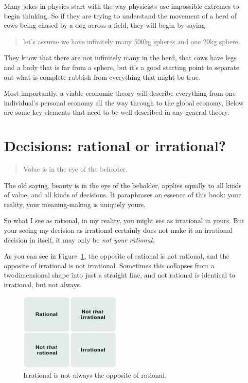 Many jokes in physics start with the way physicists  use impossible extremes to begin thinking. So if they are trying to understand the movement of a herd of cows being chased by a dog across a field, they will begin by saying: 
\begin{quote}
let's assume we have infinitely many 500kg spheres and one 20kg sphere.
\end{quote} 
They know that there are not infinitely many in the herd, that cows have legs and a body that is far from a sphere, but it's a good starting point to separate out what is complete rubbish from everything that might be true. 


Most importantly, a viable economic theory   will describe everything from one individual's personal economy all the way through to the global economy. Below are some key elements that need to be well described in any general theory.
\section{Decisions: rational or irrational?}

\begin{quote}
Value is in the eye of the beholder. 
\end{quote}


The old saying, beauty is in the eye of the beholder, applies equally to all kinds of value, and all kinds of decisions. It paraphrases an essence of this book: your reality, your meaning\hyp{}making is uniquely yours.


So what I see as rational, in my reality, you might see as irrational in yours. But your seeing my decision as irrational certainly does not make it an irrational decision in itself, it may only be \emph{not your rational}.


As you can see in Figure~\ref{table:rational-irrational}, the opposite of rational is not rational, and the opposite of irrational is not irrational. Sometimes this collapses from a two\-dimensional shape into just a straight line, and not rational is identical to irrational, but not always.


\begin{figure}
\includegraphics[width=0.45\textwidth]{./Images/Table-6_1}
\caption{Irrational is not always the opposite of rational.}
\label{table:rational-irrational}
\end{figure}


